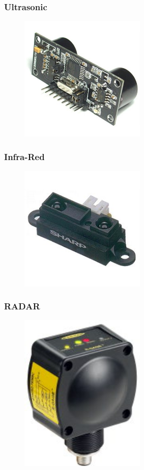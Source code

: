 \documentclass{beamer}
\begin{document}
\begin{frame}
  \frametitle{Ultrasonic}
  \begin{figure}
    \centering
    \includegraphics[width=6cm]{ultrasonic.jpg}
  \end{figure}
\end{frame}

\begin{frame}
  \frametitle{Infra-Red}
  \begin{figure}
    \centering
    \includegraphics[width=6cm]{ir.jpg}
  \end{figure}
\end{frame}

\begin{frame}
  \frametitle{RADAR}
  \begin{figure}
    \centering
    \includegraphics[width=6cm]{radar.jpg}
  \end{figure}
\end{frame}
\end{document}
